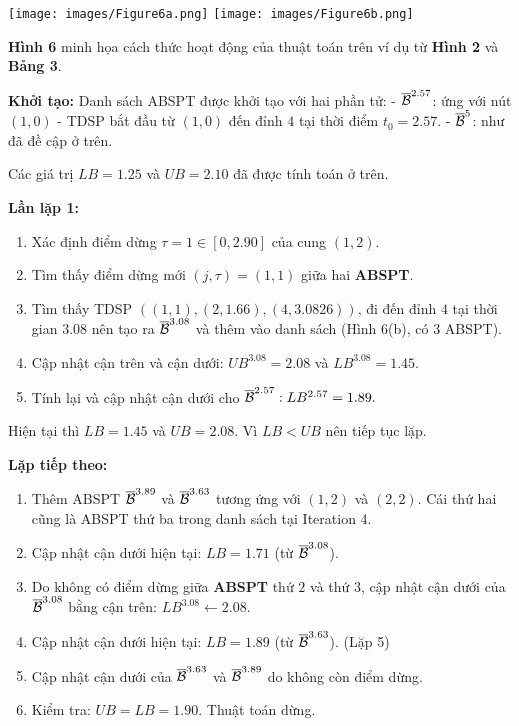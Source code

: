 \documentclass[14pt,oneside]{scrbook}
\providecommand{\tightlist}{\setlength{\itemsep}{\smallskipamount}\setlength{\parskip}{0pt}}
\begin{document}
\texttt{[image: images/Figure6a.png]}
\texttt{[image: images/Figure6b.png]}

\textbf{Hình 6} minh họa cách thức hoạt động của thuật toán trên ví dụ
từ \textbf{Hình 2} và \textbf{Bảng 3}.

\textbf{Khởi tạo:} Danh sách ABSPT được khởi tạo với hai phần tử: -
\(\overline{\cal B}^{2.57}\): ứng với nút \((1, 0)\) - TDSP bắt đầu từ
\((1, 0)\) đến đỉnh \(4\) tại thời điểm \(t_0 = 2.57\). -
\(\overline{\cal B}^{5}\): như đã đề cập ở trên.

Các giá trị \(LB=1.25\) và \(UB=2.10\) đã được tính toán ở trên.

\textbf{Lần lặp 1:}

\begin{enumerate}
\def\labelenumi{\arabic{enumi}.}
\tightlist
\item
  Xác định điểm dừng \(\tau = 1 \in [0, 2.90]\) của cung \((1, 2)\).
\item
  Tìm thấy điểm dừng mới \((j, \tau) = (1, 1)\) giữa hai \textbf{ABSPT}.
\item
  Tìm thấy TDSP \(((1, 1), (2, 1.66), (4, 3.0826))\), đi đến đỉnh \(4\)
  tại thời gian \(3.08\) nên tạo ra \(\overline{\cal B}^{3.08}\) và thêm
  vào danh sách (Hình 6(b), có 3 ABSPT).
\item
  Cập nhật cận trên và cận dưới: \(UB^{3.08} = 2.08\) và
  \(LB^{3.08} = 1.45\).
\item
  Tính lại và cập nhật cận dưới cho
  \(\overline{\cal B}^{2.57} : LB^{2.57} = 1.89.\)
\end{enumerate}

Hiện tại thì \(LB=1.45\) và \(UB = 2.08\). Vì \(LB<UB\) nên tiếp tục
lặp.

\textbf{Lặp tiếp theo:}

\begin{enumerate}
\def\labelenumi{\arabic{enumi}.}
\tightlist
\item
  Thêm ABSPT \(\overline{\cal B}^{3.89}\) và
  \(\overline{\cal B}^{3.63}\) tương ứng với \((1, 2)\) và \((2, 2)\).
  Cái thứ hai cũng là ABSPT thứ ba trong danh sách tại Iteration 4.
\item
  Cập nhật cận dưới hiện tại: \(LB = 1.71\) (từ
  \(\overline{\cal B}^{3.08}\)).
\item
  Do không có điểm dừng giữa \textbf{ABSPT} thứ \(2\) và thứ \(3\), cập
  nhật cận dưới của \(\overline{\cal B}^{3.08}\) bằng cận trên:
  \(LB^{3.08} \gets 2.08\).
\item
  Cập nhật cận dưới hiện tại: \(LB = 1.89\) (từ
  \(\overline{\cal B}^{3.63}\)). (Lặp 5)
\item
  Cập nhật cận dưới của \(\overline{\cal B}^{3.63}\) và
  \(\overline{\cal B}^{3.89}\) do không còn điểm dừng.
\item
  Kiểm tra: \(UB = LB = 1.90\). Thuật toán dừng.
\end{enumerate}
\end{document}
